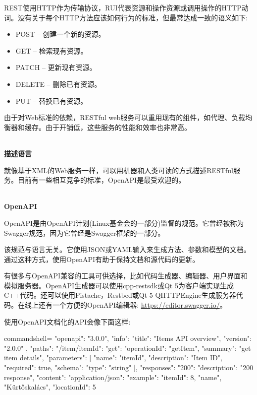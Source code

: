 REST使用HTTP作为传输协议，RUI代表资源和操作资源或调用操作的HTTP动词。没有关于每个HTTP方法应该如何行为的标准，但最常达成一致的语义如下:

\begin{itemize}
\item 
POST – 创建一个新的资源。

\item 
GET – 检索现有资源。

\item 
PATCH – 更新现有资源。

\item 
DELETE – 删除已有资源。

\item 
PUT – 替换已有资源。
\end{itemize}

由于对Web标准的依赖，RESTful web服务可以重用现有的组件，如代理、负载均衡器和缓存。由于开销低，这些服务的性能和效率也非常高。

\hspace*{\fill} \\ %
\noindent
\textbf{描述语言}

就像基于XML的Web服务一样，可以用机器和人类可读的方式描述RESTful服务。目前有一些相互竞争的标准，OpenAPI是最受欢迎的。

\hspace*{\fill} \\ %
\noindent
\textbf{OpenAPI}

OpenAPI是由OpenAPI计划(Linux基金会的一部分)监督的规范。它曾经被称为Swagger规范，因为它曾经是Swagger框架的一部分。

该规范与语言无关。它使用JSON或YAML输入来生成方法、参数和模型的文档。通过这种方式，使用OpenAPI有助于保持文档和源代码的更新。

有很多与OpenAPI兼容的工具可供选择，比如代码生成器、编辑器、用户界面和模拟服务器。OpenAPI生成器可以使用cpp-restsdk或Qt 5为客户端实现生成C++代码。还可以使用Pistache，Restbed或Qt 5 QHTTPEngine生成服务器代码。在线上还有一个方便的OpenAPI编辑器: \url{https://editor.swagger.io/}。

使用OpenAPI文档化的API会像下面这样:

\begin{tcblisting}{commandshell={}}
{
  "openapi": "3.0.0",
  "info": {
    "title": "Items API overview",
    "version": "2.0.0"
  },
  "paths": {
    "/item/{itemId}": {
      "get": {
        "operationId": "getItem",
        "summary": "get item details",
        "parameters": [
          "name": "itemId",
          "description": "Item ID",
          "required": true,
          "schema": {
            "type": "string"
        }
      ],
      "responses": {
        "200": {
          "description": "200 response",
            "content": {
              "application/json": {
                "example": {
                  "itemId": 8,
                  "name", "Kürtőskalács",
                  "locationId": 5
                }
              }
            }
          }
        }
      }
    }
  }
}
\end{tcblisting}

